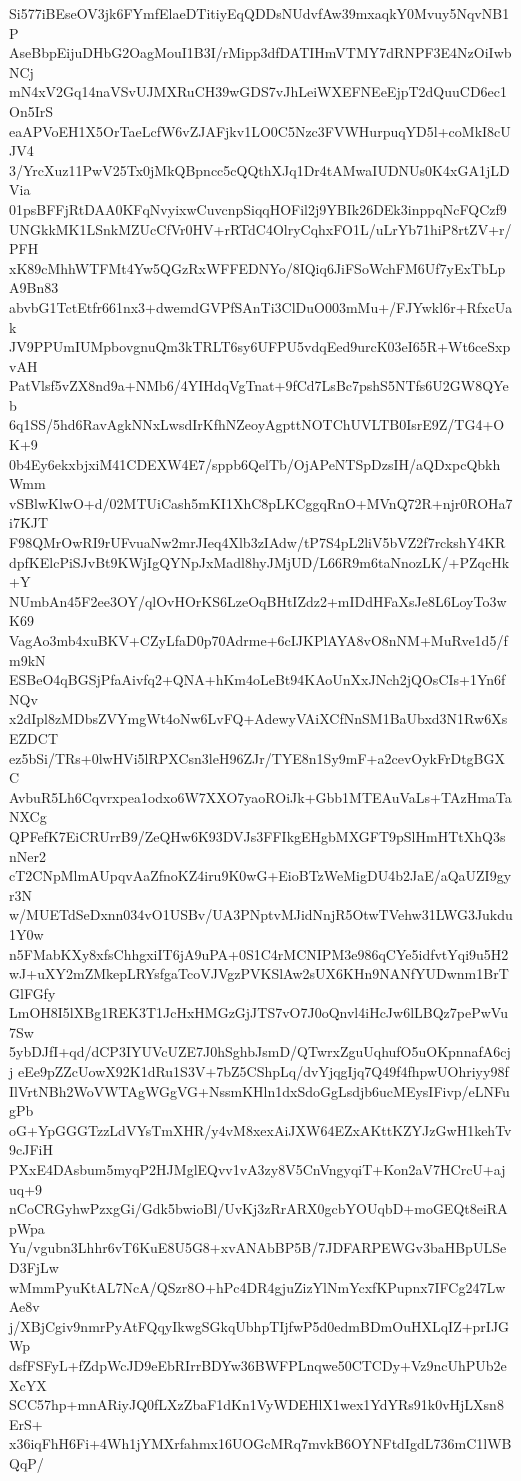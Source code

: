 Si577iBEseOV3jk6FYmfElaeDTitiyEqQDDsNUdvfAw39mxaqkY0Mvuy5NqvNB1P
AseBbpEijuDHbG2OagMouI1B3I/rMipp3dfDATIHmVTMY7dRNPF3E4NzOiIwbNCj
mN4xV2Gq14naVSvUJMXRuCH39wGDS7vJhLeiWXEFNEeEjpT2dQuuCD6ec1On5IrS
eaAPVoEH1X5OrTaeLcfW6vZJAFjkv1LO0C5Nzc3FVWHurpuqYD5l+coMkI8cUJV4
3/YrcXuz11PwV25Tx0jMkQBpncc5cQQthXJq1Dr4tAMwaIUDNUs0K4xGA1jLDVia
01psBFFjRtDAA0KFqNvyixwCuvcnpSiqqHOFil2j9YBIk26DEk3inppqNcFQCzf9
UNGkkMK1LSnkMZUcCfVr0HV+rRTdC4OlryCqhxFO1L/uLrYb71hiP8rtZV+r/PFH
xK89cMhhWTFMt4Yw5QGzRxWFFEDNYo/8IQiq6JiFSoWchFM6Uf7yExTbLpA9Bn83
abvbG1TctEtfr661nx3+dwemdGVPfSAnTi3ClDuO003mMu+/FJYwkl6r+RfxcUak
JV9PPUmIUMpbovgnuQm3kTRLT6sy6UFPU5vdqEed9urcK03eI65R+Wt6ceSxpvAH
PatVlsf5vZX8nd9a+NMb6/4YIHdqVgTnat+9fCd7LsBc7pshS5NTfs6U2GW8QYeb
6q1SS/5hd6RavAgkNNxLwsdIrKfhNZeoyAgpttNOTChUVLTB0IsrE9Z/TG4+OK+9
0b4Ey6ekxbjxiM41CDEXW4E7/sppb6QelTb/OjAPeNTSpDzsIH/aQDxpcQbkhWmm
vSBlwKlwO+d/02MTUiCash5mKI1XhC8pLKCggqRnO+MVnQ72R+njr0ROHa7i7KJT
F98QMrOwRI9rUFvuaNw2mrJIeq4Xlb3zIAdw/tP7S4pL2liV5bVZ2f7rckshY4KR
dpfKElcPiSJvBt9KWjIgQYNpJxMadl8hyJMjUD/L66R9m6taNnozLK/+PZqcHk+Y
NUmbAn45F2ee3OY/qlOvHOrKS6LzeOqBHtIZdz2+mIDdHFaXsJe8L6LoyTo3wK69
VagAo3mb4xuBKV+CZyLfaD0p70Adrme+6cIJKPlAYA8vO8nNM+MuRve1d5/fm9kN
ESBeO4qBGSjPfaAivfq2+QNA+hKm4oLeBt94KAoUnXxJNch2jQOsCIs+1Yn6fNQv
x2dIpl8zMDbsZVYmgWt4oNw6LvFQ+AdewyVAiXCfNnSM1BaUbxd3N1Rw6XsEZDCT
ez5bSi/TRs+0lwHVi5lRPXCsn3leH96ZJr/TYE8n1Sy9mF+a2cevOykFrDtgBGXC
AvbuR5Lh6Cqvrxpea1odxo6W7XXO7yaoROiJk+Gbb1MTEAuVaLs+TAzHmaTaNXCg
QPFefK7EiCRUrrB9/ZeQHw6K93DVJs3FFIkgEHgbMXGFT9pSlHmHTtXhQ3snNer2
cT2CNpMlmAUpqvAaZfnoKZ4iru9K0wG+EioBTzWeMigDU4b2JaE/aQaUZI9gyr3N
w/MUETdSeDxnn034vO1USBv/UA3PNptvMJidNnjR5OtwTVehw31LWG3Jukdu1Y0w
n5FMabKXy8xfsChhgxiIT6jA9uPA+0S1C4rMCNIPM3e986qCYe5idfvtYqi9u5H2
wJ+uXY2mZMkepLRYsfgaTcoVJVgzPVKSlAw2sUX6KHn9NANfYUDwnm1BrTGlFGfy
LmOH8I5lXBg1REK3T1JcHxHMGzGjJTS7vO7J0oQnvl4iHcJw6lLBQz7pePwVu7Sw
5ybDJfI+qd/dCP3IYUVcUZE7J0hSghbJsmD/QTwrxZguUqhufO5uOKpnnafA6cjj
eEe9pZZcUowX92K1dRu1S3V+7bZ5CShpLq/dvYjqgIjq7Q49f4fhpwUOhriyy98f
IlVrtNBh2WoVWTAgWGgVG+NssmKHln1dxSdoGgLsdjb6ucMEysIFivp/eLNFugPb
oG+YpGGGTzzLdVYsTmXHR/y4vM8xexAiJXW64EZxAKttKZYJzGwH1kehTv9cJFiH
PXxE4DAsbum5myqP2HJMglEQvv1vA3zy8V5CnVngyqiT+Kon2aV7HCrcU+ajuq+9
nCoCRGyhwPzxgGi/Gdk5bwioBl/UvKj3zRrARX0gcbYOUqbD+moGEQt8eiRApWpa
Yu/vgubn3Lhhr6vT6KuE8U5G8+xvANAbBP5B/7JDFARPEWGv3baHBpULSeD3FjLw
wMmmPyuKtAL7NcA/QSzr8O+hPc4DR4gjuZizYlNmYcxfKPupnx7IFCg247LwAe8v
j/XBjCgiv9nmrPyAtFQqyIkwgSGkqUbhpTIjfwP5d0edmBDmOuHXLqIZ+prIJGWp
dsfFSFyL+fZdpWcJD9eEbRIrrBDYw36BWFPLnqwe50CTCDy+Vz9ncUhPUb2eXcYX
SCC57hp+mnARiyJQ0fLXzZbaF1dKn1VyWDEHlX1wex1YdYRs91k0vHjLXsn8ErS+
x36iqFhH6Fi+4Wh1jYMXrfahmx16UOGcMRq7mvkB6OYNFtdIgdL736mC1lWBQqP/
